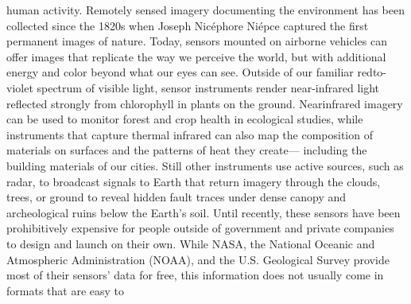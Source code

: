 human activity.
Remotely sensed imagery documenting the environment has been collected
since the 1820s when Joseph Nicéphore Niépce captured the first permanent
images of nature. Today, sensors mounted on airborne vehicles can
offer images that replicate the way we perceive the world, but with additional
energy and color beyond what our eyes can see. Outside of our familiar redto-
violet spectrum of visible light, sensor instruments render near-infrared
light reflected strongly from chlorophyll in plants on the ground. Nearinfrared
imagery can be used to monitor forest and crop health in ecological
studies, while instruments that capture thermal infrared can also map
the composition of materials on surfaces and the patterns of heat they create—
including the building materials of our cities. Still other instruments
use active sources, such as radar, to broadcast signals to Earth that return
imagery through the clouds, trees, or ground to reveal hidden fault traces
under dense canopy and archeological ruins below the Earth's soil.
Until recently, these sensors have been prohibitively expensive for people
outside of government and private companies to design and launch on their
own. While NASA, the National Oceanic and Atmospheric Administration
(NOAA), and the U.S. Geological Survey provide most of their sensors' data
for free, this information does not usually come in formats that are easy to

